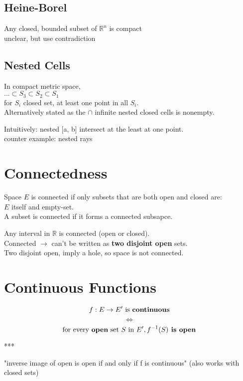 \documentclass[12pt]{article}
\begin{document}
\begin{itemize}
\subsection*{Heine-Borel}

Any closed, bounded subset of $\mathbb{R}^n$ is compact \\
\textcolor[gray]{0.5}{
unclear, but use contradiction}

\subsection*{Nested Cells}
In compact metric space, \\
$...\subset S_3 \subset S_2 \subset S_1 $\\
for $S_i$ closed set, at least one point in all $S_i$.\\
\textcolor[gray]{0.5}{Alternatively stated as the $\cap$ infinite nested closed cells is nonempty.\\}

Intuitively: nested [a, b] intersect at the least at one point.\\

counter example: nested rays

\section*{Connectedness}

Space $E$ is connected if only subsets that are both open and closed are:\\
$E$ itself and empty-set. \\

A subset is connected if it forms a connected subsapce.

Any interval in $\mathbb{R}$ is connected (open or closed).\\

Connected $\rightarrow$ can't be written as \textbf{two disjoint open} sets.\\

Two disjoint open, imply a hole, so space is not connected.

\section*{Continuous Functions}
$$f: E \rightarrow E' \text{ is \textbf{continuous}}$$
$$\iff$$
$$\text{for every \textbf{open} set } S \text{ in } E', f^{-1}(S) \textbf{\text{ is open}}$$
\centerline{***}
"inverse image of open is open if and only if f is continuous"
(also works with closed sets)


\end{itemize}
\end{document}
